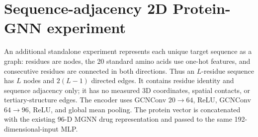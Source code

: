\section{Sequence-adjacency 2D Protein-GNN experiment}
An additional standalone experiment represents each unique target sequence as a graph: residues are nodes, the 20 standard amino acids use one-hot features, and consecutive residues are connected in both directions. Thus an $L$-residue sequence has $L$ nodes and $2(L-1)$ directed edges. It contains residue identity and sequence adjacency only; it has no measured 3D coordinates, spatial contacts, or tertiary-structure edges. The encoder uses GCNConv $20\to64$, ReLU, GCNConv $64\to96$, ReLU, and global mean pooling. The protein vector is concatenated with the existing 96-D MGNN drug representation and passed to the same 192-dimensional-input MLP.

